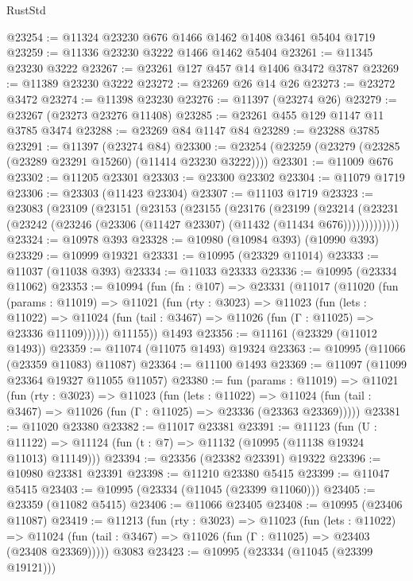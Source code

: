 \begin{lexlean}{RustStd}
\begin{coremodule}
@23254 := @11324 @23230 @676 @1466 @1462 @1408 @3461 @5404 @1719
@23259 := @11336 @23230 @3222 @1466 @1462 @5404
@23261 := @11345 @23230 @3222
@23267 := @23261 @127 @457 @14 @1406 @3472 @3787
@23269 := @11389 @23230 @3222
@23272 := @23269 @26 @14 @26
@23273 := @23272 @3472
@23274 := @11398 @23230
@23276 := @11397 (@23274 @26)
@23279 := @23267 (@23273 @23276 @11408)
@23285 := @23261 @455 @129 @1147 @11 @3785 @3474
@23288 := @23269 @84 @1147 @84
@23289 := @23288 @3785
@23291 := @11397 (@23274 @84)
@23300 := @23254 (@23259 (@23279 (@23285 (@23289 @23291 @15260) (@11414 @23230 @3222))))
@23301 := @11009 @676
@23302 := @11205 @23301
@23303 := @23300 @23302
@23304 := @11079 @1719
@23306 := @23303 (@11423 @23304)
@23307 := @11103 @1719
@23323 := @23083
    (@23109
      (@23151
        (@23153
          (@23155
            (@23176
              (@23199
                (@23214
                  (@23231 (@23242 (@23246 (@23306 (@11427 @23307) (@11432 (@11434 @676)))))))))))))
@23324 := @10978 @393
@23328 := @10980 (@10984 @393) (@10990 @393)
@23329 := @10999 @19321
@23331 := @10995 (@23329 @11014)
@23333 := @11037 (@11038 @393)
@23334 := @11033 @23333
@23336 := @10995 (@23334 @11062)
@23353 := @10994
    (fun (fn : @107) =>
    @23331
      (@11017
        (@11020
          (fun (params : @11019) =>
          @11021
            (fun (rty : @3023) =>
            @11023
              (fun (lets : @11022) =>
              @11024 (fun (tail : @3467) => @11026 (fun (Γ : @11025) => @23336 @11109))))))
        @11155))
    @1493
@23356 := @11161 (@23329 (@11012 @1493))
@23359 := @11074 (@11075 @1493) @19324
@23363 := @10995 (@11066 (@23359 @11083) @11087)
@23364 := @11100 @1493
@23369 := @11097 (@11099 @23364 @19327 @11055 @11057)
@23380 := fun (params : @11019) =>
  @11021
    (fun (rty : @3023) =>
    @11023
      (fun (lets : @11022) =>
      @11024 (fun (tail : @3467) => @11026 (fun (Γ : @11025) => @23336 (@23363 @23369)))))
@23381 := @11020 @23380
@23382 := @11017 @23381
@23391 := @11123
    (fun (U : @11122) => @11124 (fun (t : @7) => @11132 (@10995 (@11138 @19324 @11013) @11149)))
@23394 := @23356 (@23382 @23391) @19322
@23396 := @10980 @23381 @23391
@23398 := @11210 @23380 @5415
@23399 := @11047 @5415
@23403 := @10995 (@23334 (@11045 (@23399 @11060)))
@23405 := @23359 (@11082 @5415)
@23406 := @11066 @23405
@23408 := @10995 (@23406 @11087)
@23419 := @11213
    (fun (rty : @3023) =>
    @11023
      (fun (lets : @11022) =>
      @11024 (fun (tail : @3467) => @11026 (fun (Γ : @11025) => @23403 (@23408 @23369)))))
    @3083
@23423 := @10995 (@23334 (@11045 (@23399 @19121)))

\end{coremodule}
\end{lexlean}
